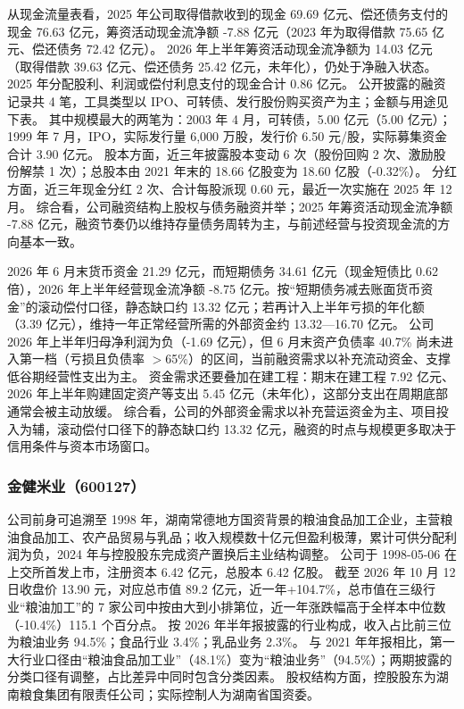  从现金流量表看，2025 年公司取得借款收到的现金 69.69 亿元、偿还债务支付的现金 76.63 亿元，筹资活动现金流净额 -7.88 亿元（2023 年为取得借款 75.65 亿元、偿还债务 72.42 亿元）。 2026 年上半年筹资活动现金流净额为 14.03 亿元（取得借款 39.63 亿元、偿还债务 25.42 亿元，未年化），仍处于净融入状态。 2025 年分配股利、利润或偿付利息支付的现金合计 0.86 亿元。 公开披露的融资记录共 4 笔，工具类型以 IPO、可转债、发行股份购买资产为主；金额与用途见下表。 其中规模最大的两笔为：2003 年 4 月，可转债，5.00 亿元（5.00 亿元）；1999 年 7 月，IPO，实际发行量 6,000 万股，发行价 6.50 元/股，实际募集资金合计 3.90 亿元。 股本方面，近三年披露股本变动 6 次（股份回购 2 次、激励股份解禁 1 次）；总股本由 2021 年末的 18.66 亿股变为 18.60 亿股（-0.32\%）。 分红方面，近三年现金分红 2 次、合计每股派现 0.60 元，最近一次实施在 2025 年 12 月。 综合看，公司融资结构上股权与债务融资并举；2025 年筹资活动现金流净额 -7.88 亿元，融资节奏仍以维持存量债务周转为主，与前述经营与投资现金流的方向基本一致。

 2026 年 6 月末货币资金 21.29 亿元，而短期债务 34.61 亿元（现金短债比 0.62 倍），2026 年上半年经营现金流净额 -8.75 亿元。按“短期债务减去账面货币资金”的滚动偿付口径，静态缺口约 13.32 亿元；若再计入上半年亏损的年化额（3.39 亿元），维持一年正常经营所需的外部资金约 13.32---16.70 亿元。 公司 2026 年上半年归母净利润为负（-1.69 亿元），但 6 月末资产负债率 40.7\% 尚未进入第一档（亏损且负债率 $>$65\%）的区间，当前融资需求以补充流动资金、支撑低谷期经营性支出为主。 资金需求还要叠加在建工程：期末在建工程 7.92 亿元、2026 年上半年购建固定资产等支出 5.45 亿元（未年化），这部分支出在周期底部通常会被主动放缓。 综合看，公司的外部资金需求以补充营运资金为主、项目投入为辅，滚动偿付口径下的静态缺口约 13.32 亿元，融资的时点与规模更多取决于信用条件与资本市场窗口。




\subsubsection{金健米业（600127）}
\label{co:600127}

 公司前身可追溯至 1998 年，湖南常德地方国资背景的粮油食品加工企业，主营粮油食品加工、农产品贸易与乳品；收入规模数十亿元但盈利极薄，累计可供分配利润为负，2024 年与控股股东完成资产置换后主业结构调整。 公司于 1998-05-06 在上交所首发上市，注册资本 6.42 亿元，总股本 6.42 亿股。 截至 2026 年 10 月 12 日收盘价 13.90 元，对应总市值 89.2 亿元，近一年+104.7\%，总市值在三级行业“粮油加工”的 7 家公司中按由大到小排第位，近一年涨跌幅高于全样本中位数（-10.4\%）115.1 个百分点。 按 2026 年半年报披露的行业构成，收入占比前三位为粮油业务 94.5\%；食品行业 3.4\%；乳品业务 2.3\%。 与 2021 年年报相比，第一大行业口径由“粮油食品加工业”（48.1\%）变为“粮油业务”（94.5\%）；两期披露的分类口径有调整，占比差异中同时包含分类因素。 股权结构方面，控股股东为湖南粮食集团有限责任公司；实际控制人为湖南省国资委。

